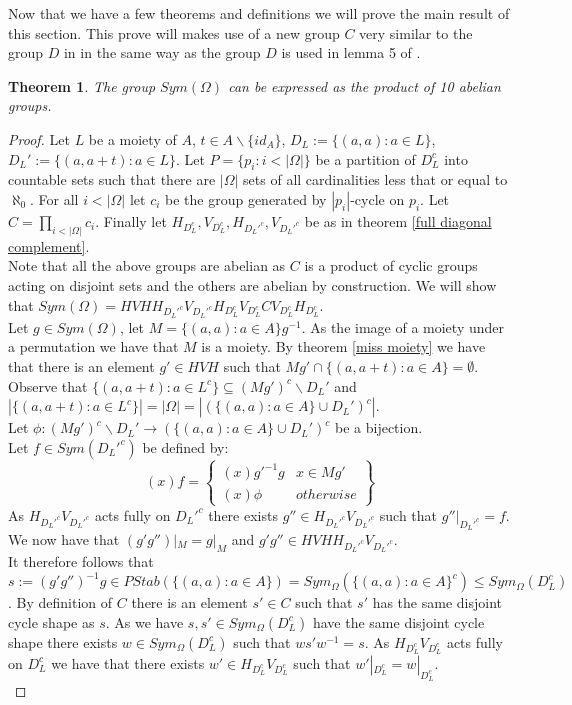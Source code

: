 \documentclass{report}
\newtheorem{theorem}{Theorem}[section]
\begin{document}
Now that we have a few theorems and definitions we will prove the main result of this section. This prove will makes use of a new group \(C\) very similar to the group \(D\) in \cite{abelian prod} in the same way as the group \(D\) is used in lemma 5 of \cite{abelian prod}.
\begin{theorem}
The group \(Sym(\Omega)\) can be expressed as the product of 10 abelian groups.
\end{theorem}
\begin{proof}
Let \(L\) be a moiety of \(A\), \(t\in A\backslash \{id_A\}\), \(D_L:=\{(a,a):a\in L\}\),  \(D_L':=\{(a,a+t):a\in L\}\). Let \(P=\{p_i:i<|\Omega|\}\) be a partition of \(D_L^c\) into countable sets such that there are \(|\Omega|\) sets of all cardinalities less that or equal to \(\aleph_0\). For all \(i<|\Omega|\) let \(c_i\) be the group generated by \(|p_i|\)-cycle on \(p_i\). Let \(C=\prod_{i<|\Omega|}c_i\). Finally let \(H_{D_L^c},V_{D_L^c},H_{D_L'^c},V_{D_L'^c}\) be as in theorem \ref{full diagonal complement}.\\
Note that all the above groups are abelian as \(C\) is a product of cyclic groups acting on disjoint sets and the others are abelian by construction.
We will show that \(Sym(\Omega)=HVHH_{D_L'^c}V_{D_L'^c}H_{D_L^c}V_{D_L^c}CV_{D_L^c}H_{D_L^c}\).\\
Let \(g\in Sym(\Omega)\), let \(M=\{(a,a):a\in A\}g^{-1}\). As the image of a moiety under a permutation we have that \(M\) is a moiety. By theorem \ref{miss moiety} we have that there is an element \(g'\in HVH\) such that \(Mg'\cap \{(a,a+t):a\in A\}=\emptyset\).\\
Observe that \(\{(a,a+t):a\in L^c\}\subseteq (Mg')^c\backslash D_{L}'\) and \(|\{(a,a+t):a\in L^c\}|=|\Omega|=|(\{(a,a):a\in A\}\cup D_L')^c|\).\\
Let \(\phi: (Mg')^c\backslash D_{L}' \rightarrow (\{(a,a):a\in A\}\cup D_L')^c\) be a bijection.\\
Let \(f\in Sym(D_L'^c)\) be defined by:
\[(x)f=\left\{\begin{array}{lr}
(x)g'^{-1}g& x\in Mg'\\
(x)\phi & otherwise
\end{array}\right\}\]
As \(H_{D_L'^c}V_{D_L'^c}\) acts fully on \(D_L'^c\) there exists \(g''\in H_{D_L'^c}V_{D_L'^c}\) such that \(g''|_{D_L'^c}=f\). We now have that \((g'g'')|_M=g|_M\) and \(g'g''\in HVHH_{D_L'^c}V_{D_L'^c}\).\\
It therefore follows that \(s:=(g'g'')^{-1}g \in PStab(\{(a,a):a\in A\})= Sym_{\Omega}(\{(a,a):a\in A\}^c)\leq Sym_{\Omega}(D_L^c)\). By definition of \(C\) there is an element \(s'\in C\) such that \(s'\) has the same disjoint cycle shape as \(s\). As we have \(s,s'\in Sym_{\Omega}(D_L^c)\) have the same disjoint cycle shape there exists \(w\in Sym_{\Omega}(D_L^c)\) such that \(w s' w^{-1}=s\). As \(H_{D_L^c}V_{D_L^c}\) acts fully on \(D_L^c\) we have that there exists \(w'\in H_{D_L^c}V_{D_L^c}\) such that \(w'|_{D_L^c}=w|_{D_L^c}\).\\

\end{proof}
\end{document}
